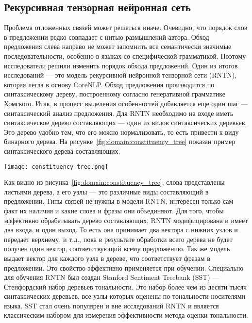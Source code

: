 \subsection{Рекурсивная тензорная нейронная сеть}
Проблема отложенных связей может решаться иначе. Очевидно, что порядок слов в предложении редко совпадает с нитью размышлений автора. Обход предложения слева направо не может запомнить все семантически значимые последовательности, особенно в языках со специфической грамматикой. Поэтому исследователи решили изменить порядок обхода предложений. Один из итогов исследований --- это модель рекурсивной нейронной тензорной сети (RNTN), которая легла в основу CoreNLP\@. Обход предложения производится по синтаксическому дереву, построенному согласно генеративной грамматике Хомского\cite{Chomsky}.
Итак, в процесс выделения особенностей добавляется еще один шаг --- синтаксический анализ предложения. Для RNTN необходимо на входе иметь синтаксическое дерево составляющих --- один из видов синтаксических деревьев. Это дерево удобно тем, что его можно нормализовать, то есть привести к виду бинарного дерева. На рисунке~\ref{fig:domain:constituency_tree} показан пример синтаксического дерева составляющих\cite{Chomsky}.

\begin{center}
  \texttt{[image: constituency\_tree.png]}
  \label{fig:domain:constituency_tree}
\end{center}

Как видно из рисунка~\ref{fig:domain:constituency_tree}, слова представлены листьями дерева, а его узлы --- это различные виды составляющий в предложении. Типы связей не нужны в модели RNTN, интересен только сам факт их наличия и какие слова и фразы они объединяют. Для того, чтобы эффективно обрабатывать дерево составляющих, RNTN модифицирована и имеет два входа, и один выход. То есть она принимает два вектора с нижних узлов и передает верхнему, и т.д., пока в результате обработки всего дерева не будет получен один вектор, соответствующий всему предложению. Так же модель выдает вектор для каждого узла в дереве, что соответствует фразам в предложении. Это свойство эффективно применяется при обучении. Специально для обучения RNTN был создан Stanford Sentiment Treebank (SST) --- Стенфордский набор деревьев тональности. Это набор более чем из десяти тысяч синтаксических деревьев, все узлы которых оценены по тональности носителями языка. SST стал очень популярен и вне исследований RNTN и является классическим набором для измерения эффективности метода оценки тональности\cite{RNTN}.

